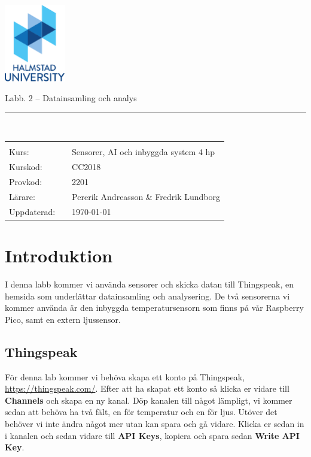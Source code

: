 \documentclass{article}
\newcommand{\kursnamn}{Sensorer, AI och inbyggda system 4 hp}
\newcommand{\kurskod}{CC2018}
\newcommand{\provkod}{2201}
\begin{document}
  \includegraphics[width=0.2\textwidth]{figures/HH_ENG_color_small.pdf}
	\begin{center}
	{\Huge{}Labb. 2 -- Datainsamling och analys}
	\end{center}
\noindent\rule{\textwidth}{2pt}
\\


{\Large

\begin{tabular}{p{2cm}p{1cm}p{10cm}}
&  &  \\
Kurs: & 	& 	\kursnamn \\
Kurskod: & & \kurskod \\
Provkod: &  & \provkod \\
L\"arare: &  & Pererik Andreasson \& Fredrik Lundborg\\
Uppdaterad: & & \today
\end{tabular}

}
\pagebreak

\tableofcontents

\section{Introduktion}
I denna labb kommer vi använda sensorer och skicka datan till Thingspeak, en hemsida som underlättar datainsamling och analysering. De två sensorerna vi kommer använda är den inbyggda temperatursensorn som finns på vår Raspberry Pico, samt en extern ljussensor.

\subsection{Thingspeak}
För denna lab kommer vi behöva skapa ett konto på Thingspeak, \url{https://thingspeak.com/}. Efter att ha skapat ett konto så klicka er vidare till \textbf{Channels} och skapa en ny kanal. Döp kanalen till något lämpligt, vi kommer sedan att behöva ha två fält, en för temperatur och en för ljus. Utöver det behöver vi inte ändra något mer utan kan spara och gå vidare. Klicka er sedan in i kanalen och sedan vidare till \textbf{API Keys}, kopiera och spara sedan \textbf{Write API Key}.
\end{document}
